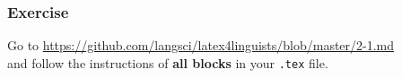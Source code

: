 \begin{frame}[fragile]
\frametitle{Exercise}


Go to \url{https://github.com/langsci/latex4linguists/blob/master/2-1.md}\\
and follow the instructions of \textbf{all blocks} in your \texttt{.tex} file.


\end{frame}


%
%
%


%
%	
%
%
%
